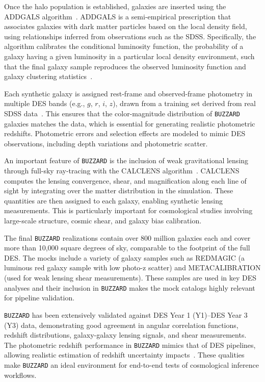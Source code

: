 Once the halo population is established, galaxies are inserted using the \ac{ADDGALS} algorithm~\citep{wechsler2022addgals}. \ac{ADDGALS} is a semi-empirical prescription that associates galaxies with dark matter particles based on the local density field, using relationships inferred from observations such as the \ac{SDSS}. Specifically, the algorithm calibrates the conditional luminosity function, the probability of a galaxy having a given luminosity in a particular local density environment, such that the final galaxy sample reproduces the observed luminosity function and galaxy clustering statistics~\citep{DES:2019jmj,wechsler2022addgals}.

Each synthetic galaxy is assigned rest-frame and observed-frame photometry in multiple \ac{DES} bands (e.g., $g$, $r$, $i$, $z$), drawn from a training set derived from real \ac{SDSS} data~\citep{DES:2019jmj}. This ensures that the color-magnitude distribution of \texttt{BUZZARD} galaxies matches the data, which is essential for generating realistic photometric redshifts. Photometric errors and selection effects are modeled to mimic \ac{DES} observations, including depth variations and photometric scatter.

An important feature of \texttt{BUZZARD} is the inclusion of weak gravitational lensing through full-sky ray-tracing with the CALCLENS algorithm~\citep{becker2013calclens}. CALCLENS computes the lensing convergence, shear, and magnification along each line of sight by integrating over the matter distribution in the simulation. These quantities are then assigned to each galaxy, enabling synthetic lensing measurements. This is particularly important for cosmological studies involving large-scale structure, cosmic shear, and galaxy bias calibration.

The final \texttt{BUZZARD} realizations contain over 800 million galaxies each and cover more than 10,000 square degrees of sky, comparable to the footprint of the full \ac{DES}. The mocks include a variety of galaxy samples such as REDMAGIC (a luminous red galaxy sample with low photo-z scatter) and METACALIBRATION (used for weak lensing shear measurements). These samples are used in key \ac{DES} analyses and their inclusion in \texttt{BUZZARD} makes the mock catalogs highly relevant for pipeline validation.

\texttt{BUZZARD} has been extensively validated against \ac{DES} Year 1 (Y1)--\ac{DES} Year 3 (Y3) data, demonstrating good agreement in angular correlation functions, redshift distributions, galaxy-galaxy lensing signals, and shear measurements. The photometric redshift performance in \texttt{BUZZARD} mimics that of \ac{DES} pipelines, allowing realistic estimation of redshift uncertainty impacts~\citep{DES:2019jmj,DES:2021bwg}. These qualities make \texttt{BUZZARD} an ideal environment for end-to-end tests of cosmological inference workflows.

